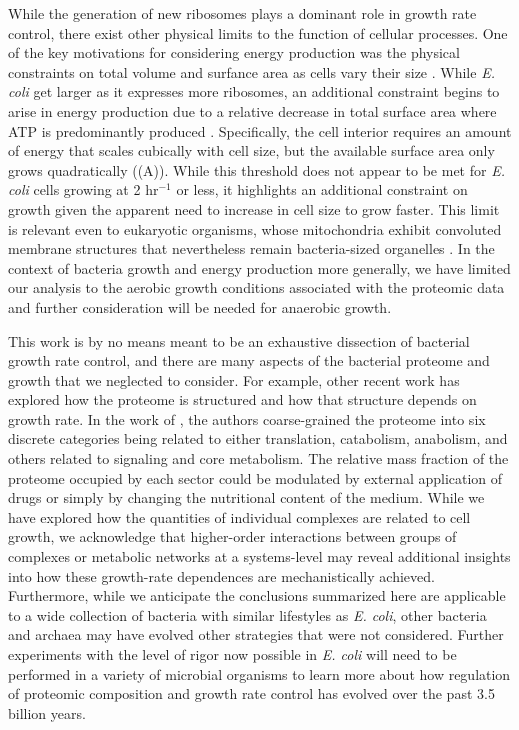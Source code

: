 While the generation of new ribosomes plays a dominant role in growth rate
control, there exist other physical limits to the function of cellular
processes. One of the key motivations for considering energy production was the
physical constraints on total volume and surfance area as cells vary their size
\citep{harris2018, ojkic2019}. While \textit{E. coli} get larger as it expresses
more ribosomes, an additional constraint begins to arise in energy production
due to a relative decrease in total surface area where ATP is predominantly
produced \citep{szenk2017}. Specifically, the cell interior requires an amount
of energy that scales cubically with cell size, but the available surface area
only grows quadratically ((A)). While this threshold does
not appear to be met for \textit{E. coli} cells growing at 2 hr$^{-1}$ or less,
it highlights an additional constraint on growth given the apparent need to
increase in cell size to grow faster. This limit is relevant even to
eukaryotic organisms, whose mitochondria exhibit convoluted membrane structures
that nevertheless remain bacteria-sized organelles \citep{guo2018}. In the
context of bacteria growth and energy production more generally, we have limited
our analysis to the aerobic growth conditions associated with the proteomic data
and further consideration will be needed for anaerobic growth.

This work is by no means meant to be an exhaustive dissection of bacterial
growth rate control, and there are many aspects of the bacterial proteome and
growth that we neglected to consider. For example, other recent work
\citep{liebermeister2014, hui2015, schmidt2016} has explored how the proteome is
structured and how that structure depends on growth rate. In the work of
\cite{hui2015}, the authors coarse-grained the proteome into six discrete
categories being related to either translation, catabolism, anabolism, and
others related to signaling and core metabolism. The relative mass fraction of
the proteome occupied by each sector could be modulated by external application
of drugs or simply by changing the nutritional content of the medium. While we
have explored how the quantities of individual complexes are related to cell
growth, we acknowledge that higher-order interactions between groups of
complexes or metabolic networks at a systems-level may reveal additional
insights into how these growth-rate dependences  are mechanistically achieved.
Furthermore, while we anticipate the conclusions summarized here are applicable
to a wide collection of bacteria with similar lifestyles as \textit{E. coli},
other bacteria and archaea may have evolved other strategies that were not
considered. Further experiments with the level of rigor now possible in
\textit{E. coli} will need to be performed in a variety of microbial organisms
to learn more about how regulation of proteomic composition and  growth rate
control has evolved over the past 3.5 billion years.

